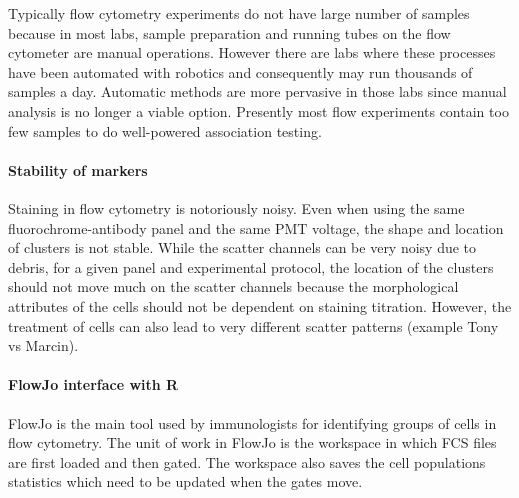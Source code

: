 Typically flow cytometry experiments do not have large number of samples because in most labs, sample preparation and running tubes on the flow cytometer are manual operations.
However there are labs where these processes have been automated with robotics
and consequently may run thousands of samples a day.
Automatic methods are more pervasive in those labs since manual analysis is no longer a viable option.
Presently most flow experiments contain too few samples to do well-powered association testing.


\paragraph{ Stability of markers }

Staining in flow cytometry is notoriously noisy.
Even when using the same fluorochrome-antibody panel and the same PMT voltage, the shape and location of clusters is not stable.
While the scatter channels can be very noisy due to debris, for a given panel and experimental protocol,
the location of the clusters should not move much on the scatter channels because the morphological attributes of the cells should not be dependent on staining titration.
However, the treatment of cells can also lead to very different scatter patterns (example Tony vs Marcin).


\paragraph{ FlowJo interface with R}

FlowJo is the main tool used by immunologists for identifying groups of cells in flow cytometry.
The unit of work in FlowJo is the workspace in which FCS files are first loaded and then gated.
The workspace also saves the cell populations statistics which need to be updated when the gates move.

